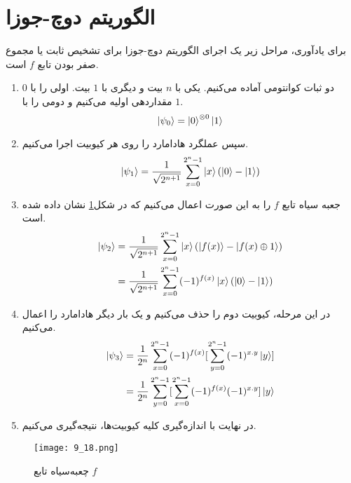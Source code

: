 \section{الگوریتم دوچ-جوزا}
برای یادآوری، مراحل زیر یک اجرای الگوریتم دوچ-جوزا برای تشخیص ثابت یا مجموع صفر بودن تابع $f$ است. 
\begin{enumerate}
	\item دو ثبات کوانتومی آماده می‌کنیم. یکی با $n$ بیت و دیگری با $1$ بیت. اولی را با $0$ مقداردهی اولیه می‌کنیم و دومی را با $1$. 
	\begin{equation}
		\ket{\psi_{0}} = \ket{0}^{\otimes 0}\ket{1}
	\end{equation}
	\item سپس عملگرد هادامارد را روی هر کیوبیت اجرا می‌کنیم. 
	\begin{equation}
		\ket{\psi_{1}} = \frac{1}{\sqrt{2^{n+1}}} \sum_{x=0}^{2^{n}-1} \ket{x}(\ket{0}-\ket{1})
	\end{equation}
	\item جعبه‌ سیاه تابع $f$ را به این صورت اعمال می‌کنیم که در شکل\ref{fig:9-18} نشان داده شده است.
	\begin{equation}
		\begin{split}
		\ket{\psi_{2}} & = \frac{1}{\sqrt{2^{n+1}}} \sum_{x=0}^{2^{n}-1} \ket{x}(\ket{f(x)}-\ket{f(x) \oplus 1}) \\
		& = \frac{1}{\sqrt{2^{n+1}}} \sum_{x=0}^{2^{n}-1} (-1)^{f(x)}\ket{x}(\ket{0}-\ket{1})
		\end{split}
	\end{equation}
	\item در این مرحله، کیوبیت دوم را حذف می‌کنیم و یک بار دیگر هادامارد را اعمال می‌کنیم.  
\begin{equation}
		\begin{split}
		\ket{\psi_{3}} & = \frac{1}{2^{n}} \sum_{x=0}^{2^{n}-1} (-1)^{f(x)}   [\sum_{y=0}^{2^{n}-1} (-1)^{x.y}\ket{y} ]\\
		& = \frac{1}{2^{n}} \sum_{y=0}^{2^{n}-1} [\sum_{x=0}^{2^{n}-1} (-1)^{f(x)} (-1)^{x.y} ]\ket{y} \\
		\end{split}
	\end{equation}
	\item در نهایت با اندازه‌گیری کلیه کیوبیت‌ها، نتیجه‌گیری می‌کنیم. 
\end{enumerate}

\begin{figure}[h]
	\caption{چعبه‌سیاه تابع $f$ }
	\centering
	\texttt{[image: 9\_18.png]}
	\label{fig:9-18}
\end{figure} 

